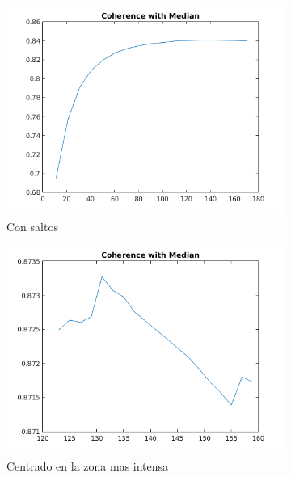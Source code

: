\begin{figure}[H]
	\centering
	\begin{subfigure}[b]{0.48\textwidth}
        \includegraphics[width=1\textwidth]{./Figures/Results/coherenceWithMedianJump.png}
        \caption{Con saltos}
        \label{fig:thermalforanisodiffwithmediana}
  \end{subfigure}
  \begin{subfigure}[b]{0.48\textwidth}
        \includegraphics[width=1\textwidth]{./Figures/Results/coherenceWithMedianCentrado.png}
        \caption{Centrado en la zona mas intensa}
        \label{fig:thermalforanisodiffwithmedianacentered}
  \end{subfigure}
  \begin{subfigure}[b]{0.48\textwidth}

\end{subfigure}
\end{figure}
